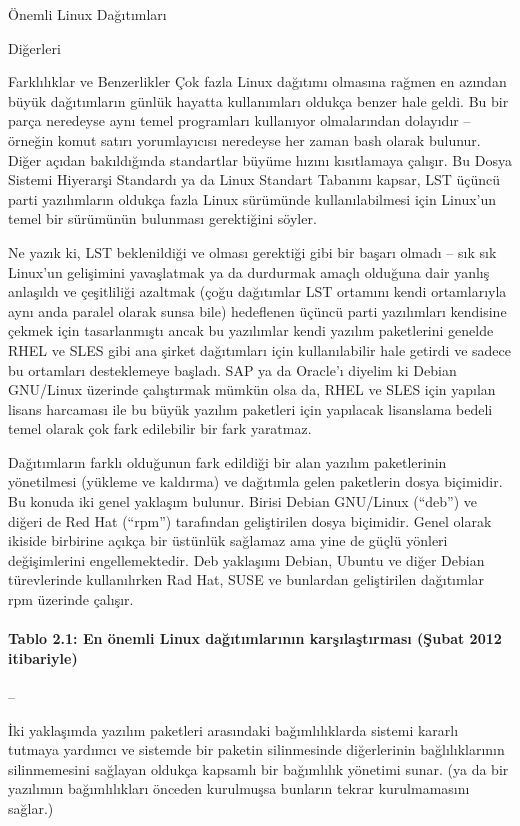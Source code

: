 \begin{section}{Önemli Linux Dağıtımları}
\begin{subsection}{Diğerleri}
\end{subsection}
\begin{subsection}{Farklılıklar ve Benzerlikler}
\label{sec:bolum247}
Çok fazla Linux dağıtımı olmasına rağmen en azından büyük dağıtımların günlük hayatta kullanımları oldukça benzer hale geldi. Bu bir parça neredeyse aynı temel programları kullanıyor olmalarından dolayıdır – örneğin komut satırı yorumlayıcısı neredeyse her zaman bash olarak bulunur. Diğer açıdan bakıldığında standartlar büyüme hızını kısıtlamaya çalışır. Bu Dosya Sistemi Hiyerarşi Standardı ya da Linux Standart Tabanını kapsar, LST üçüncü parti yazılımların oldukça fazla Linux sürümünde kullanılabilmesi için Linux'un temel bir sürümünün bulunması gerektiğini söyler.

Ne yazık ki, LST beklenildiği ve olması gerektiği gibi bir başarı olmadı – sık sık Linux'un gelişimini yavaşlatmak ya da durdurmak amaçlı olduğuna dair yanlış anlaşıldı ve çeşitliliği azaltmak (çoğu dağıtımlar LST ortamını kendi ortamlarıyla aynı anda paralel olarak sunsa bile) hedeflenen üçüncü parti yazılımları kendisine çekmek için tasarlanmıştı ancak bu yazılımlar kendi yazılım paketlerini genelde RHEL ve SLES gibi ana şirket dağıtımları için kullanılabilir hale getirdi ve sadece bu ortamları desteklemeye başladı. SAP ya da Oracle'ı diyelim ki Debian GNU/Linux üzerinde çalıştırmak mümkün olsa da, RHEL ve SLES için yapılan lisans harcaması ile bu büyük yazılım paketleri için yapılacak lisanslama bedeli temel olarak çok fark edilebilir bir fark yaratmaz.

Dağıtımların farklı olduğunun fark edildiği bir alan yazılım paketlerinin yönetilmesi (yükleme ve kaldırma) ve dağıtımla gelen paketlerin dosya biçimidir. Bu konuda iki genel yaklaşım bulunur. Birisi Debian GNU/Linux (“deb”) ve diğeri de Red Hat (“rpm”) tarafından geliştirilen dosya biçimidir. Genel olarak ikiside birbirine açıkça bir üstünlük sağlamaz ama yine de güçlü yönleri değişimlerini engellemektedir. Deb yaklaşımı Debian, Ubuntu ve diğer Debian türevlerinde kullanılırken Rad Hat, SUSE ve bunlardan geliştirilen dağıtımlar rpm üzerinde çalışır.
\paragraph{Tablo 2.1: En önemli Linux dağıtımlarının karşılaştırması (Şubat 2012 itibariyle)}{ --}

İki yaklaşımda yazılım paketleri arasındaki bağımlılıklarda sistemi kararlı tutmaya yardımcı ve sistemde bir paketin silinmesinde diğerlerinin bağlılıklarının silinmemesini sağlayan oldukça kapsamlı bir bağımlılık yönetimi sunar. (ya da bir yazılımın bağımlılıkları önceden kurulmuşsa bunların tekrar kurulmamasını sağlar.)


\end{subsection}
\end{section}
